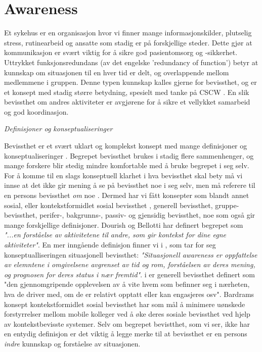 \section{Awareness}
\label{chp: awareness}

Et sykehus er en organisasjon hvor vi finner mange informasjonskilder, plutselig stress, rutinearbeid og ansatte som stadig er på forskjellige steder. Dette gjør at kommunikasjon er svært viktig for å sikre god pasientomsorg og -sikkerhet\cite{Klemets12}. Uttrykket funksjonsredundans (av det engelske 'redundancy of function') betyr at kunnskap om situasjonen til en hver tid er delt, og overlappende mellom medlemmene i gruppen.\cite{KlemetsRedundancy} Denne typen kunnskap kalles gjerne for bevissthet, og er et konsept med stadig større betydning, spesielt med tanke på CSCW \cite{Dourish92}. En slik bevissthet om andres aktiviteter er avgjørene for å sikre et vellykket samarbeid og god koordinasjon\cite{KlemetsRedundancy}. 

\noindent
\emph{Definisjoner og konseptualiseringer}

\noindent
Bevissthet er et svært uklart og komplekst konsept med mange definisjoner og konseptualiseringer \cite{KlemetsRedundancy}\cite{Gutwin04}\cite{Schmidt02}. Begrepet bevissthet brukes i stadig flere sammenhenger, og mange forskere blir stedig mindre komfortable med å bruke begrepet i seg selv. For å komme til en slags konseptuell klarhet i hva bevissthet skal bety må vi innse at det ikke gir mening å se på bevissthet noe i seg selv, men må referere til en persons bevissthet \emph{om} noe \cite{Schmidt02}. Dermed har vi fått konsepter som blandt annet sosial, eller kontekstformidlet sosial bevissthet \cite{Bardram04}, generell bevissthet\cite{Gross13}, gruppe-bevissthet\cite{Gutwin04}, perifer-, bakgrunns-, passiv- og gjensidig bevissthet\cite{Schmidt02}, noe som også gir mange forskjellige definisjoner. Dourish og Bellotti har definert begrepet som \emph{"...en forståelse av aktivitetene til andre, som gir kontekst for dine egne aktiviteter"}. En mer inngående definisjon finner vi i \cite{Endsly95}, som tar for seg konseptualliseringen situasjonell bevissthet: \emph{"Situasjonell awareness er oppfattelse av elemntene i omgivelsene avgrenset av tid og rom, forståelsen av deres mening, og prognosen for deres status i nær fremtid"}. i \cite{Gross13} er generell bevissthet definert som "den gjennomgripende opplevelsen av å vite hvem som befinner seg i nærheten, hva de driver med, om de er relativt opptatt eller kan engasjeres osv". Bardrams konsept kontekstformidlet sosial bevissthet har som mål å minimere uønskede forstyrrelser mellom mobile kolleger ved å øke deres sosiale bevissthet ved hjelp av kontekstbevisste systemer\cite{Bardram04}. Selv om begrepet bevistthet, som vi ser, ikke har en entydig definisjon er det viktig å legge merke til at bevissthet er en persons \emph{indre} kunnskap og forståelse av situasjonen.\cite{Gross13} 

